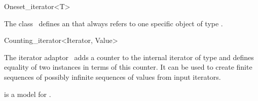 \begin{ccRefClass}{Oneset_iterator<T>}
  \label{sectionOnesetIterator}

  
  \ccDefinition The class \ccClassTemplateName\ defines an
   that always refers to one specific object of
  type .
  

  \ccIsModel
  
  \ccCreation

  
  \ccTagFullDeclarations{}\ccTagDefaults
  
  \ccSeeAlso

\end{ccRefClass}

\begin{ccRefClass}{Counting_iterator<Iterator, Value>}
  \label{sectionCountingIterator}

  
  \ccDefinition The iterator adaptor \ccClassTemplateName\ adds a
  counter to the internal iterator of type  and defines
  equality of two instances in terms of this counter. It can be used
  to create finite sequences of possibly infinite sequences of values
  from input iterators.


  \ccIsModel
  
  \ccRequirements {} is a model for
  .

  \ccCreation

  
  

  \ccSeeAlso

\end{ccRefClass}

